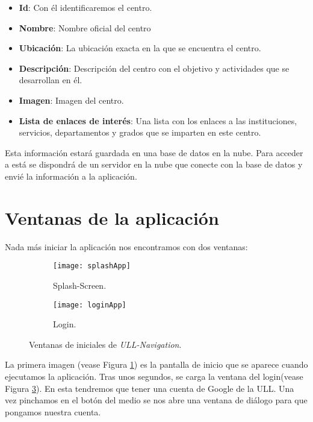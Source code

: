 \begin{itemize}
    \item \textbf{Id}: Con él identificaremos el centro.
    \item \textbf{Nombre}: Nombre oficial del centro
    \item \textbf{Ubicación}: La ubicación exacta en la que se encuentra el centro. 
    \item \textbf{Descripción}: Descripción del centro con el objetivo y actividades que se desarrollan en él.
    \item \textbf{Imagen}: Imagen del centro.
    \item \textbf{Lista de enlaces de interés}: Una lista con los enlaces a las instituciones, servicios, departamentos y grados que se imparten en este centro.
\end{itemize}

Esta información estará guardada en una base de datos en la nube. Para acceder a está se dispondrá de un servidor en la nube que conecte con la base de datos y envié la información a la aplicación.

\section{Ventanas de la aplicación}


Nada más iniciar la aplicación nos encontramos con dos ventanas:

\begin{figure}[h]
\hspace*{\fill}%
\begin{subfigure}[h]{0.35\linewidth}
\texttt{[image: splashApp]}
\caption{Splash-Screen.}
\label{fig:splashApp}
\end{subfigure}
\hfill%
\begin{subfigure}[h]{0.35\linewidth}
\texttt{[image: loginApp]}
\caption{Login.}
\label{fig:loginApp} 
\end{subfigure}%
\caption{Ventanas de iniciales de \textit{ULL-Navigation}.}
\hspace*{\fill}%
\end{figure}
  
La primera imagen (vease Figura \ref{fig:splashApp}) es la pantalla de inicio que se aparece cuando ejecutamos la aplicación. Tras unos segundos, se carga la ventana del login(vease Figura \ref{fig:loginApp}). En esta tendremos que tener una cuenta de Google de la ULL. Una vez pinchamos en el botón del medio se nos abre una ventana de diálogo para que pongamos nuestra cuenta.

